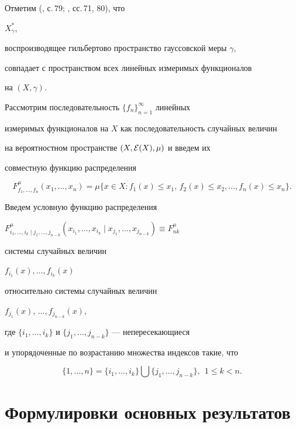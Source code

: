 Отметим (\cite{Bogach}, с.\,79; \cite{Lif}, сс.\,71, 80), что


$X_\gamma^*$,


воспроизводящее гильбертово пространство гауссовской меры $\gamma$,


совпадает с пространством всех линейных измеримых функционалов


на $(X,\gamma)$.





Рассмотрим последовательность $\{f_n\}_{n=1}^\infty$ линейных 


измеримых функционалов на $X$ как последовательность случайных величин


на вероятностном пространстве $(X,{\cal E}(X),\mu)$ и введем их


совместную функцию распределения


$$


F_{f_1,\dotsc,f_n}^\mu(x_1,\dotsc,x_n)=


\mu\big\{x\in X:f_1(x)\le x_1,\,f_2(x)\le x_2,\dotsc,f_n(x)\le


x_n\big\}.


$$





Введем условную функцию распределения


$F^\mu_{i_1,\dotsc,i_k\mid j_1,\dotsc,j_{n-k}}


(x_{i_1},\dotsc,x_{i_k}\mid x_{j_1},\dotsc,x_{j_{n-k}})\equiv F^\mu_{nk}$


системы случайных величин


$f_{i_1}(x),\dotsc,f_{i_k}(x)$


относительно системы случайных величин


$f_{j_1}(x)$, $\dotsc,f_{j_{n-k}}(x)$,




где $\{i_1,\dotsc,i_k\}$ и $\{j_1,\dotsc,j_{n-k}\}$ --- непересекающиеся


и упорядоченные по возрастанию множества индексов такие, что


$$


\{1,\dotsc,n\}=\{i_1,\dotsc,i_k\}\bigcup\{j_1,\dotsc,j_{n-k}\},\ \ 1\le k<n.


$$








\section{Формулировки основных результатов}





